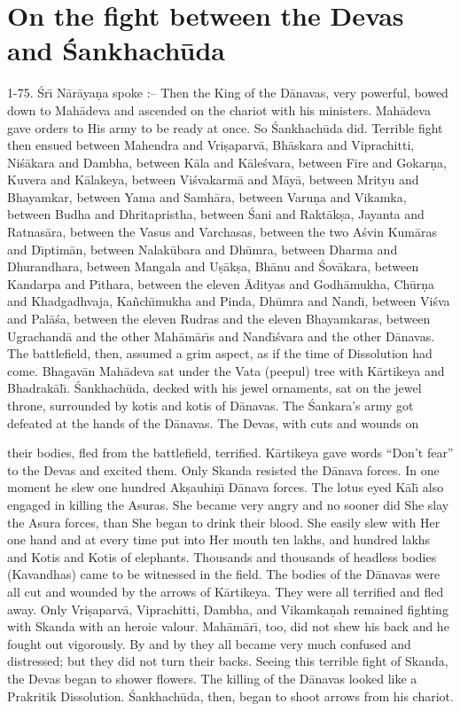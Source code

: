 \chapter{On the fight between the Devas and \'Sankhach\=uda}

1-75. \'Sr\={\i} N\=ar\=aya\d{n}a spoke :-- Then the King of the D\=anavas, very powerful, bowed down to Mah\=adeva and ascended on the chariot with his ministers. Mah\=adeva gave orders to His army to be ready at once. So \'Sankhach\=uda did. Terrible fight then ensued between Mahendra and Vri\d{s}aparv\=a, Bh\=askara and Viprachitti, Ni\'s\=akara and Dambha, between K\=ala and K\=ale\'svara, between Fire and Gokar\d{n}a, Kuvera and K\=alakeya, between Vi\'svakarm\=a and M\=ay\=a, between Mrityu and Bhayamkar, between Yama and Samh\=ara, between Varu\d{n}a and Vikamka, between Budha and Dhritapristha, between \'Sani and Rakt\=ak\d{s}a, Jayanta and Ratnas\=ara, between the Vasus and Varchasas, between the two A\'svin Kum\=aras and D\={\i}ptim\=an, between Nalak\=ubara and Dh\=umra, between Dharma and Dhurandhara, between Mangala and U\d{s}\=ak\d{s}a, Bh\=anu and \'Sov\=akara, between Kandarpa and P\={\i}thara, between the eleven \=Adityas and Godh\=amukha, Ch\=ur\d{n}a and Khadgadhvaja, Ka\~nch\={\i}mukha and Pinda, Dh\=umra and Nand\={\i}, between Vi\'sva and Pal\=a\'sa, between the eleven Rudras and the eleven Bhayamkaras, between Ugrachand\=a and the other Mah\=am\=ar\={\i}s and Nand\={\i}\'svara and the other D\=anavas. The battlefield, then, assumed a grim aspect, as if the time of Dissolution had come. Bhagav\=an Mah\=adeva sat under the Vata (peepul) tree with K\=artikeya and Bhadrak\=al\={\i}. \'Sankhach\=uda, decked with his jewel ornaments, sat on the jewel throne, surrounded by kotis and kotis of D\=anavas. The \'Sankara's army got defeated at the hands of the D\=anavas. The Devas, with cuts and wounds on

their bodies, fled from the battlefield, terrified. K\=artikeya gave words ``Don't fear'' to the Devas and excited them. Only Skanda resisted the D\=anava forces. In one moment he slew one hundred Ak\d{s}auhi\d{n}\={\i} D\=anava forces. The lotus eyed K\=al\={\i} also engaged in killing the Asuras. She became very angry and no sooner did She slay the Asura forces, than She began to drink their blood. She easily slew with Her one hand and at every time put into Her mouth ten lakhs, and hundred lakhs and Kotis and Kotis of elephants. Thousands and thousands of headless bodies (Kavandhas) came to be witnessed in the field. The bodies of the D\=anavas were all cut and wounded by the arrows of K\=artikeya. They were all terrified and fled away. Only Vri\d{s}aparv\=a, Viprachitti, Dambha, and Vikamka\d{n}ah remained fighting with Skanda with an heroic valour. Mah\=am\=ar\={\i}, too, did not shew his back and he fought out vigorously. By and by they all became very much confused and distressed; but they did not turn their backs. Seeing this terrible fight of Skanda, the Devas began to shower flowers. The killing of the D\=anavas looked like a Prakritik Dissolution. \'Sankhach\=uda, then, began to shoot arrows from his chariot.

